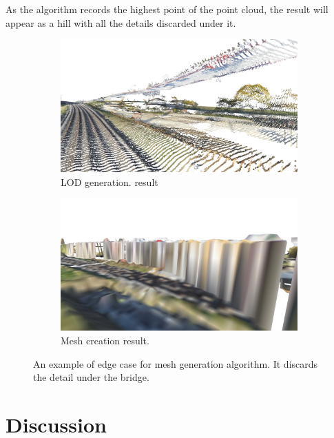 As the algorithm records the highest point of the point cloud, the result will appear as a hill with all the details discarded under it.

\begin{figure}[h]
    \centering
    
    \begin{subfigure}{0.45\textwidth}
        \centering
        \includegraphics[width=\textwidth]{lod-edgecase.jpg}
        \caption{LOD generation. result}
    \end{subfigure}
    \begin{subfigure}{0.45\textwidth}
        \centering
        \includegraphics[width=\textwidth]{mesh-edgecase.jpg}
        \caption{Mesh creation result.}
    \end{subfigure}
    
    \caption{An example of edge case for mesh generation algorithm. It discards the detail under the bridge.}
    \label{fig:results:mesh-edgecase}
\end{figure}

\section{Discussion}

